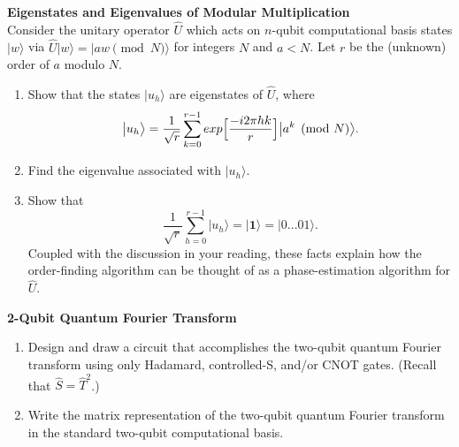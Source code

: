 \documentclass[12pt,letterpaper,boxed,cm]{hmcpset}
\newcommand{\ket}[1]{\big\lvert #1\big\rangle}
\begin{document}
\begin{problem}[2.]
    \textbf{Eigenstates and Eigenvalues of Modular Multiplication}\\
    Consider the unitary operator $\hat{U}$ which acts on $n$-qubit computational basis states $\ket{w}$ via $\hat{U}\ket{w} = \ket{aw \pmod{N}}$ for integers $N$ and $a<N$.  Let $r$ be the (unknown) order of $a$ modulo $N$.
    \begin{enumerate}[label=(\alph*)]
        \item Show that the states $\ket{u_h}$ are eigenstates of $\hat{U}$, where
        \[
            \ket{u_h} = \frac{1}{\sqrt{r}} \sum_{k=0}^{r-1} exp \Bigl[ \frac{-i2\pi h k}{r}\Bigr] \ket{a^k\pmod{N}}.
        \]
        \item Find the eigenvalue associated with $\ket{u_h}$.
        \item Show that
        \[
            \frac{1}{\sqrt{r}} \sum_{h=0}^{r-1} \ket{u_h} = \ket{\mathbf{1}} = \ket{0...01}.
        \]
        Coupled with the discussion in your reading, these facts explain how the order-finding algorithm can be thought of as a phase-estimation algorithm for $\hat{U}$.
    \end{enumerate}
\end{problem}

\begin{solution}
    \vfill
\end{solution}
\newpage

\begin{problem}[3.]
    \textbf{2-Qubit Quantum Fourier Transform}
    \begin{enumerate}[label=(\alph*)]
        \item Design and draw a circuit that accomplishes the two-qubit quantum Fourier transform using only Hadamard, controlled-S, and/or CNOT gates.  (Recall that $\hat{S} = \hat{T}^2$.)
        \item Write the matrix representation of the two-qubit quantum Fourier transform in the standard two-qubit computational basis. 
    \end{enumerate}
\end{problem}

\begin{solution}
    \vfill
\end{solution}
\end{document}
